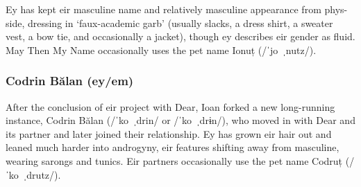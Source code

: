 Ey has kept eir masculine name and relatively masculine appearance from phys-side, dressing in `faux-academic garb' (usually slacks, a dress shirt, a sweater vest, a bow tie, and occasionally a jacket), though ey describes eir gender as fluid. May Then My Name occasionally uses the pet name Ionuț (/ˈjo~ˌnutz/).

\begin{comment}
\emph{Appears in:}

\begin{itemize}
\tightlist
\item
  \href{https://qoheleth.post-self.ink}{\emph{Qoheleth}}
\item
  \href{https://toledot.post-self.ink}{\emph{Toledot}}
\item
  \href{https://neviim.post-self.ink}{\emph{Nevi'im}}
\item
  \href{https://mitzvot.post-self.ink}{\emph{Mitzvot}}
\item
  ``Selected Letters''
\end{itemize}
\end{comment}

\subsubsection{Codrin Bălan (ey/em)}

After the conclusion of eir project with Dear, Ioan forked a new long-running instance, Codrin Bălan (/ˈko~ˌdrin/ or /ˈko~ˌdrɨn/), who moved in with Dear and its partner and later joined their relationship. Ey has grown eir hair out and leaned much harder into androgyny, eir features shifting away from masculine, wearing sarongs and tunics. Eir partners occasionally use the pet name Codruț (/ˈko~ˌdrutz/).

\begin{comment}
\emph{Appears in:}

\begin{itemize}
\tightlist
\item
  \href{https://qoheleth.post-self.ink}{\emph{Qoheleth}}
\item
  \href{https://toledot.post-self.ink}{\emph{Toledot}}
\item
  \href{https://neviim.post-self.ink}{\emph{Nevi'im}}
\item
  \href{https://mitzvot.post-self.ink}{\emph{Mitzvot} and ``Selected Letters''}
\end{itemize}
\end{comment}


